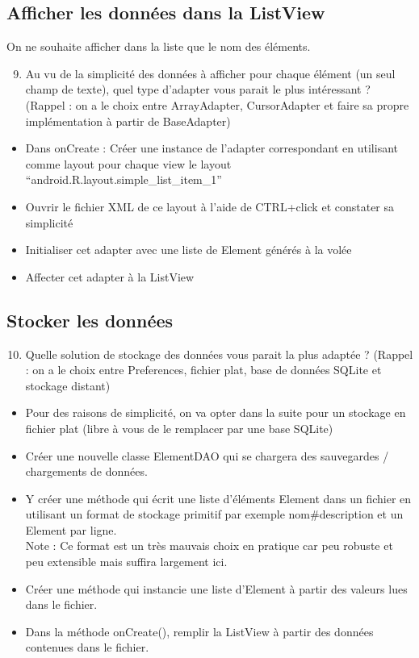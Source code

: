 \documentclass{article}
\begin{document}
 \subsection{Afficher les données dans la ListView}
    On ne souhaite afficher dans la liste que le nom des éléments.
      \begin{enumerate}
 \setcounter{enumi}{8}
\item Au vu de la simplicité des données à afficher pour chaque élément (un seul
champ de texte), quel type d'adapter vous parait le plus intéressant ? (Rappel :
on a le choix entre ArrayAdapter, CursorAdapter et faire sa propre implémentation à partir de BaseAdapter)
\end{enumerate}
 \begin{itemize}
  \item Dans onCreate : Créer une instance de l'adapter correspondant en
  utilisant comme layout pour chaque view le layout ``android.R.layout.simple\_list\_item\_1''
  \item Ouvrir le fichier XML de ce layout à l'aide de CTRL+click et constater
  sa simplicité
  \item Initialiser cet adapter avec une liste de Element générés à la volée
  \item Affecter cet adapter à la ListView
 \end{itemize}
  \subsection{Stocker les données}
  \begin{enumerate}
 \setcounter{enumi}{9}
\item Quelle solution de stockage des données vous parait la plus adaptée ?
(Rappel : on a le choix entre Preferences, fichier plat, base de données SQLite et stockage distant)
\end{enumerate}
 \begin{itemize}
  \item Pour des raisons de simplicité, on va opter dans la suite pour un stockage en fichier plat (libre à vous de le remplacer par une base SQLite)
  \item Créer une nouvelle classe ElementDAO qui se chargera des sauvegardes /
  chargements de données.
  \item Y créer une méthode qui écrit une liste d'éléments Element dans un
  fichier en utilisant un format de stockage primitif par exemple
  nom\#description et un Element par ligne.
  \\Note : Ce format est un très mauvais choix en pratique car peu robuste et
  peu extensible mais suffira largement ici.
  \item Créer une méthode qui instancie une liste d'Element à partir des valeurs
  lues dans le fichier.
  \item Dans la méthode onCreate(), remplir la ListView à partir des données contenues dans le fichier.
 \end{itemize}
\end{document}

